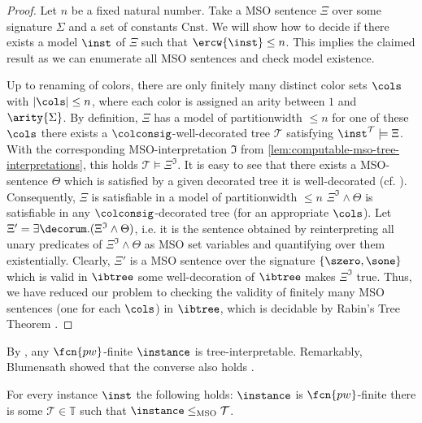 \begin{proof}
Let $n$ be a fixed natural number. Take a MSO sentence $\Xi$ over some signature $\Sigma$ and a set of constants $\mathrm{Cnst}$. We will show how to decide if there exists a model $\inst$ of $\Xi$ such that $\ercw{\inst} \leq n$. This implies the claimed result as we can enumerate all MSO sentences and check model existence.%

Up to renaming of colors, there are only finitely many distinct color sets $\cols$ with $|\cols| \leq n$, where each color is assigned an arity between $1$ and $\arity{\Sigma}$. 
By definition, $\Xi$ has a model of partitionwidth $\leq n$ \iffi for one of these $\cols$ there exists a $\colconsig$-well-decorated tree $\mathcal{T}$ satisfying $\inst^\mathcal{T} \models \Xi$. With the corresponding MSO-interpretation $\mathfrak{I}$ from \cref{lem:computable-mso-tree-interpretations}, this holds \iffi $\mathcal{T} \models \Xi^\mathfrak{I}$.
It is easy to see that there exists a MSO-sentence $\Theta$ which is satisfied by a given decorated tree \iffi it is well-decorated (cf. ).
Consequently, $\Xi$ is satisfiable in a model of partitionwidth $\leq n$ \iffi $\Xi^\mathfrak{I}\wedge \Theta$ is satisfiable in any $\colconsig$-decorated tree (for an appropriate $\cols$).
Let $\Xi' = \exists \decorum. (\Xi^\mathfrak{I}\wedge \Theta)$, i.e. it is the sentence obtained by reinterpreting all unary predicates of $\Xi^{\mathfrak{I}}\wedge \Theta$ as MSO set variables and quantifying over them existentially. Clearly, $\Xi'$ is a MSO sentence over the signature $\{\szero,\sone\}$ which is valid in $\ibtree$ \iffi some well-decoration of $\ibtree$ makes $\Xi^{\mathfrak{I}}$ true. Thus, we have reduced our problem to checking the validity of finitely many MSO sentences (one for each $\cols$) in $\ibtree$, which is decidable by Rabin's Tree Theorem \cite[Thm 1.1]{Rabin69}.
\end{proof}


By , any $\fcn{pw}$-finite $\instance$ is tree-interpretable.
Remarkably, Blumensath showed that the converse also holds \cite[Thm. 41]{Blumensath06}.

\begin{theorem}\label{thm:pw-coincides-mso-interpretability-trees} For every instance $\inst$ the following holds:
$\instance$ is $\fcn{pw}$-finite \iffi there is some  $\mathcal{T} \in \mathbb{T}$ such that $\instance \leq_{\text{MSO}} \mathcal{T}$.   
\end{theorem}


